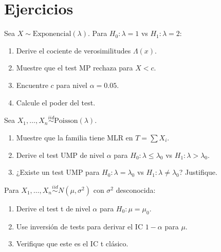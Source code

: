 
\section{Ejercicios}
\label{sec:ch4-ejercicios}

\begin{exercise}
	\label{ex:ch4-ej1}
	Sea $X \sim \text{Exponencial}(\lambda)$. Para $H_0: \lambda = 1$ vs
	$H_1: \lambda = 2$:
	\begin{enumerate}[label=(\alph*)]
		\item Derive el cociente de verosimilitudes $\Lambda(x)$.
		\item Muestre que el test MP rechaza para $X < c$.
		\item Encuentre $c$ para nivel $\alpha = 0.05$.
		\item Calcule el poder del test.
	\end{enumerate}
\end{exercise}

\begin{exercise}
	\label{ex:ch4-ej2}
	Sea $X_1, \ldots, X_n \overset{iid}{\sim} \text{Poisson}(\lambda)$.
	\begin{enumerate}[label=(\alph*)]
		\item Muestre que la familia tiene MLR en $T = \sum X_i$.
		\item Derive el test UMP de nivel $\alpha$ para $H_0: \lambda \leq \lambda_0$
		      vs $H_1: \lambda > \lambda_0$.
		\item ¿Existe un test UMP para $H_0: \lambda = \lambda_0$ vs
		      $H_1: \lambda \neq \lambda_0$? Justifique.
	\end{enumerate}
\end{exercise}

\begin{exercise}
	\label{ex:ch4-ej3}
	Para $X_1, \ldots, X_n \overset{iid}{\sim} N(\mu, \sigma^2)$ con $\sigma^2$
	desconocida:
	\begin{enumerate}[label=(\alph*)]
		\item Derive el test t de nivel $\alpha$ para $H_0: \mu = \mu_0$.
		\item Use inversión de tests para derivar el IC $1-\alpha$ para $\mu$.
		\item Verifique que este es el IC t clásico.
	\end{enumerate}
\end{exercise}

